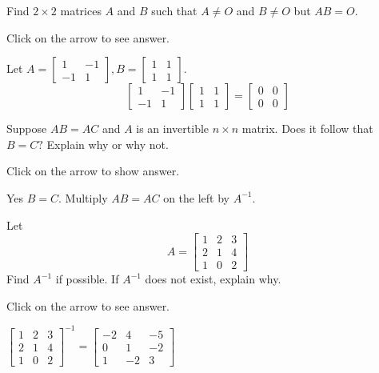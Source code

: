 \documentclass{ximera}
\begin{document}
\begin{problem}\label{prb:4.18} Find $2 \times 2$ matrices $A$ and $B$ such that $A \neq O$ and $B \neq O$ but $AB = O$.

Click on the arrow to see answer.
\begin{expandable}
Let $A = \left[
\begin{array}{rr}
1 & -1 \\
-1 & 1
\end{array}
\right], B = \left[
\begin{array}{cc}
1 & 1 \\
1 & 1
\end{array}
\right].$
\[
\left[
\begin{array}{rr}
1 & -1 \\
-1 & 1
\end{array}
\right] \left[
\begin{array}{cc}
1 & 1 \\
1 & 1
\end{array}
\right] = \left[
\begin{array}{cc}
0 & 0 \\
0 & 0
\end{array}
\right]
\]
\end{expandable}
\end{problem}

\begin{problem}\label{prb:4.32} Suppose $AB=AC$ and $A$ is an invertible $n\times n$ matrix. Does it
follow that $B=C?$ Explain why or why not.

Click on the arrow to show answer.
\begin{expandable}
Yes $B=C$. Multiply $AB = AC$ on the left by $A^{-1}$.
\end{expandable}
\end{problem}

\begin{problem}\label{prb:4.40}Let
\begin{equation*}
A=\left[
\begin{array}{rrr}
1 & 2 & 3 \\
2 & 1 & 4 \\
1 & 0 & 2
\end{array}
\right]
\end{equation*}
Find $A^{-1}$ if possible. If $A^{-1}$ does not exist, explain why.

Click on the arrow to see answer.
\begin{expandable}
$\left[
\begin{array}{ccc}
1 & 2 & 3 \\
2 & 1 & 4 \\
1 & 0 & 2
\end{array}
\right]^{-1}= \left[
\begin{array}{rrr}
-2 & 4 & -5 \\
0 & 1 & -2 \\
1 & -2 & 3
\end{array}
\right]$
\end{expandable}
\end{problem}
\end{document}
